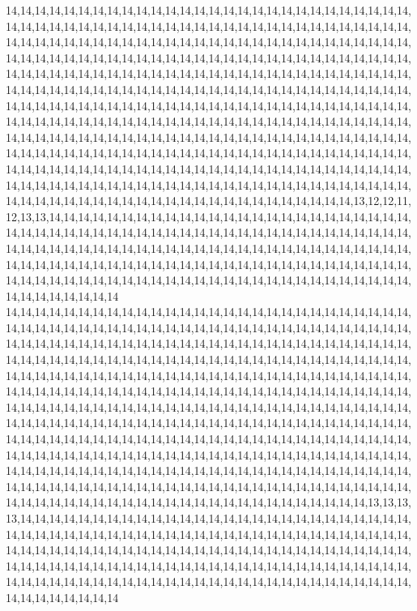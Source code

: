 14,14,14,14,14,14,14,14,14,14,14,14,14,14,14,14,14,14,14,14,14,14,14,14,14,14,14,14,14,14,14,14,14,14,14,14,14,14,14,14,14,14,14,14,14,14,14,14,14,14,14,14,14,14,14,14,14,14,14,14,14,14,14,14,14,14,14,14,14,14,14,14,14,14,14,14,14,14,14,14,14,14,14,14,14,14,14,14,14,14,14,14,14,14,14,14,14,14,14,14,14,14,14,14,14,14,14,14,14,14,14,14,14,14,14,14,14,14,14,14,14,14,14,14,14,14,14,14,14,14,14,14,14,14,14,14,14,14,14,14,14,14,14,14,14,14,14,14,14,14,14,14,14,14,14,14,14,14,14,14,14,14,14,14,14,14,14,14,14,14,14,14,14,14,14,14,14,14,14,14,14,14,14,14,14,14,14,14,14,14,14,14,14,14,14,14,14,14,14,14,14,14,14,14,14,14,14,14,14,14,14,14,14,14,14,14,14,14,14,14,14,14,14,14,14,14,14,14,14,14,14,14,14,14,14,14,14,14,14,14,14,14,14,14,14,14,14,14,14,14,14,14,14,14,14,14,14,14,14,14,14,14,14,14,14,14,14,14,14,14,14,14,14,14,14,14,14,14,14,14,14,14,14,14,14,14,14,14,14,14,14,14,14,14,14,14,14,14,14,14,14,14,14,14,14,14,14,14,14,14,14,14,14,14,14,14,14,14,14,14,14,14,14,14,14,14,14,14,14,14,14,14,14,14,14,14,14,14,14,14,14,14,14,14,14,14,14,14,14,14,14,14,14,14,14,14,14,14,14,14,13,12,12,11,12,13,13,14,14,14,14,14,14,14,14,14,14,14,14,14,14,14,14,14,14,14,14,14,14,14,14,14,14,14,14,14,14,14,14,14,14,14,14,14,14,14,14,14,14,14,14,14,14,14,14,14,14,14,14,14,14,14,14,14,14,14,14,14,14,14,14,14,14,14,14,14,14,14,14,14,14,14,14,14,14,14,14,14,14,14,14,14,14,14,14,14,14,14,14,14,14,14,14,14,14,14,14,14,14,14,14,14,14,14,14,14,14,14,14,14,14,14,14,14,14,14,14,14,14,14,14,14,14,14,14,14,14,14,14,14,14,14,14,14,14,14,14,14,14,14,14,14
14,14,14,14,14,14,14,14,14,14,14,14,14,14,14,14,14,14,14,14,14,14,14,14,14,14,14,14,14,14,14,14,14,14,14,14,14,14,14,14,14,14,14,14,14,14,14,14,14,14,14,14,14,14,14,14,14,14,14,14,14,14,14,14,14,14,14,14,14,14,14,14,14,14,14,14,14,14,14,14,14,14,14,14,14,14,14,14,14,14,14,14,14,14,14,14,14,14,14,14,14,14,14,14,14,14,14,14,14,14,14,14,14,14,14,14,14,14,14,14,14,14,14,14,14,14,14,14,14,14,14,14,14,14,14,14,14,14,14,14,14,14,14,14,14,14,14,14,14,14,14,14,14,14,14,14,14,14,14,14,14,14,14,14,14,14,14,14,14,14,14,14,14,14,14,14,14,14,14,14,14,14,14,14,14,14,14,14,14,14,14,14,14,14,14,14,14,14,14,14,14,14,14,14,14,14,14,14,14,14,14,14,14,14,14,14,14,14,14,14,14,14,14,14,14,14,14,14,14,14,14,14,14,14,14,14,14,14,14,14,14,14,14,14,14,14,14,14,14,14,14,14,14,14,14,14,14,14,14,14,14,14,14,14,14,14,14,14,14,14,14,14,14,14,14,14,14,14,14,14,14,14,14,14,14,14,14,14,14,14,14,14,14,14,14,14,14,14,14,14,14,14,14,14,14,14,14,14,14,14,14,14,14,14,14,14,14,14,14,14,14,14,14,14,14,14,14,14,14,14,14,14,14,14,14,14,14,14,14,14,14,14,14,14,14,14,14,14,14,14,14,14,14,14,14,14,14,14,14,14,14,13,13,13,13,14,14,14,14,14,14,14,14,14,14,14,14,14,14,14,14,14,14,14,14,14,14,14,14,14,14,14,14,14,14,14,14,14,14,14,14,14,14,14,14,14,14,14,14,14,14,14,14,14,14,14,14,14,14,14,14,14,14,14,14,14,14,14,14,14,14,14,14,14,14,14,14,14,14,14,14,14,14,14,14,14,14,14,14,14,14,14,14,14,14,14,14,14,14,14,14,14,14,14,14,14,14,14,14,14,14,14,14,14,14,14,14,14,14,14,14,14,14,14,14,14,14,14,14,14,14,14,14,14,14,14,14,14,14,14,14,14,14,14,14,14,14,14,14,14,14,14
